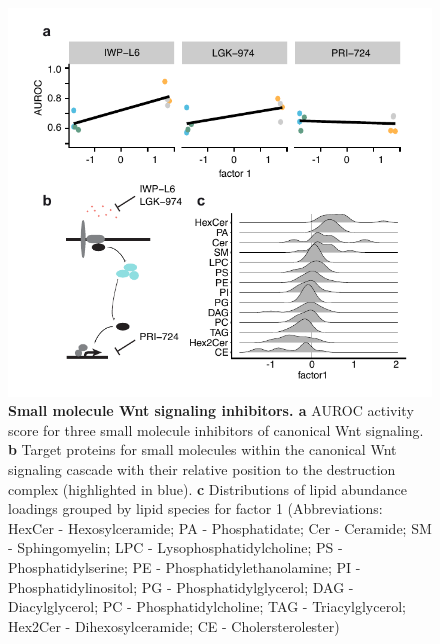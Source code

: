 \begin{flushleft}
\begin{figure}[h!]
\centering
\includegraphics[scale=0.75,keepaspectratio]{figures/adenomaprofiling/pdf/fig_2_2.pdf}
\caption{\textbf{Small molecule Wnt signaling inhibitors. a} AUROC activity score for three small molecule inhibitors of canonical Wnt signaling. \textbf{b} Target proteins for small molecules within the canonical Wnt signaling cascade with their relative position to the destruction complex (highlighted in blue). \textbf{c} Distributions of lipid abundance loadings grouped by lipid species for factor 1 (Abbreviations: HexCer - Hexosylceramide; PA - Phosphatidate; Cer - Ceramide; SM - Sphingomyelin; LPC - Lysophosphatidylcholine; PS - Phosphatidylserine; PE - Phosphatidylethanolamine; PI - Phosphatidylinositol; PG - Phosphatidylglycerol; DAG - Diacylglycerol; PC - Phosphatidylcholine; TAG - Triacylglycerol; Hex2Cer - Dihexosylceramide; CE - Cholersterolester)}
\label{fig_199}
\end{figure}
\bigbreak


\end{flushleft}
